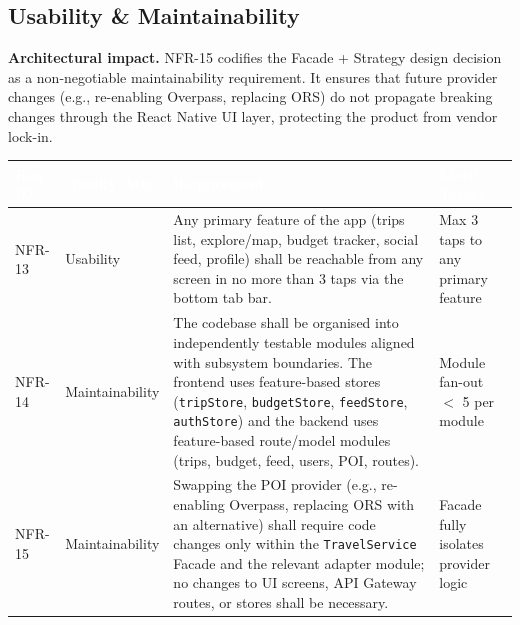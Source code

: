\documentclass[12pt, a4paper]{article}
\newcommand{\reqid}[1]{\textsc{\small #1}}
\newcommand{\thcell}[1]{\textcolor{white}{\textbf{\small #1}}}
\begin{document}
\subsection{Usability \& Maintainability}

\begin{tcolorbox}[notebox]
  \textbf{Architectural impact.} NFR-15 codifies the Facade + Strategy design decision as a non-negotiable maintainability requirement. It ensures that future provider changes (e.g., re-enabling Overpass, replacing ORS) do not propagate breaking changes through the React Native UI layer, protecting the product from vendor lock-in.
\end{tcolorbox}

\vspace{0.4em}
\begin{longtable}{C{1.5cm} C{2.4cm} L{7.0cm} C{2.7cm}}
\toprule
{}
\thcell{Req ID} & \thcell{Quality Attr.} & \thcell{Requirement} & \thcell{Metric / Target} \\
\midrule
\endhead
\bottomrule
\endfoot

\reqid{NFR-13} & Usability &
Any primary feature of the app (trips list, explore/map, budget tracker, social feed, profile) shall be reachable from any screen in no more than 3 taps via the bottom tab bar. &
Max 3 taps to any primary feature \\

\reqid{NFR-14} & Maintainability &
The codebase shall be organised into independently testable modules aligned with subsystem boundaries. The frontend uses feature-based stores (\texttt{tripStore}, \texttt{budgetStore}, \texttt{feedStore}, \texttt{authStore}) and the backend uses feature-based route/model modules (trips, budget, feed, users, POI, routes). &
Module fan-out $<$ 5 per module \\

\reqid{NFR-15} & Maintainability &
Swapping the POI provider (e.g., re-enabling Overpass, replacing ORS with an alternative) shall require code changes only within the \texttt{TravelService} Facade and the relevant adapter module; no changes to UI screens, API Gateway routes, or stores shall be necessary. &
Facade fully isolates provider logic \\

\end{longtable}
\end{document}
